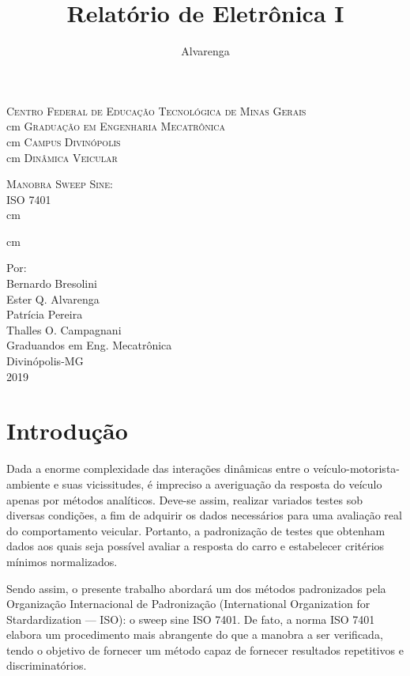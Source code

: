 \documentclass[a4paper, 12pt]{article}
\title{Relatório de Eletrônica I}
\author{Alvarenga}
\begin{document}
\begin{titlepage}

\newcommand{\HRule}{\rule{\linewidth}{0.0mm}} 
\center 
\textsc{\Large Centro Federal de Educação Tecnológica de Minas Gerais}\\[0.7 cm]
 cm
\textsc{\Large Graduação em Engenharia Mecatrônica}\\[0.7 cm]
 cm
\textsc{\Large Campus Divinópolis}\\[0.7 cm]
 cm
\textsc{\Large Dinâmica Veicular}\\[7 cm]


\begin{center}
\textsc{\Huge Manobra Sweep Sine: \\
\large{ISO 7401}}
\\[0.5cm]
 cm
{\LARGE }\\[1 cm]

 \end{center}

 cm
\begin{center} \Large
Por:\\[1.5 cm]
Bernardo Bresolini\\
Ester Q. Alvarenga \\
Patrícia Pereira\\
Thalles O. Campagnani \\

Graduandos em Eng. Mecatrônica\\[2.5 cm]
Divinópolis-MG\\2019
\end{center}

\end{titlepage}

\tableofcontents
\pagebreak

\section{Introdução}
Dada a enorme complexidade das interações dinâmicas entre o veículo-motorista-ambiente e suas vicissitudes, é impreciso a averiguação da resposta do veículo apenas por métodos analíticos. Deve-se assim, realizar variados testes sob diversas condições, a fim de adquirir os dados necessários para uma avaliação real do comportamento veicular. Portanto, a padronização de testes que obtenham dados aos quais seja possível avaliar a resposta do carro e estabelecer critérios mínimos normalizados.

Sendo assim, o presente trabalho abordará um dos métodos padronizados pela Organização Internacional de Padronização (International Organization for Stardardization --- ISO): o sweep sine ISO 7401. De fato, a norma ISO 7401 elabora um procedimento mais abrangente do que a manobra a ser verificada, tendo o objetivo de fornecer um método capaz de fornecer resultados repetitivos e discriminatórios.
\end{document}
